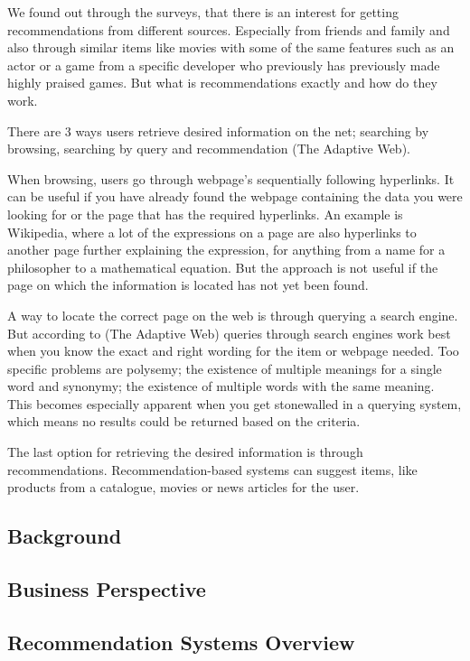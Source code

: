 We found out through the surveys, that there is an interest for getting recommendations from different sources. Especially from friends and family and also through similar items like movies with some of the same features such as an actor or a game from a specific developer who previously has previously made highly praised games. But what is recommendations exactly and how do they work.

There are 3 ways users retrieve desired information on the net; searching by browsing, searching by query and recommendation (The Adaptive Web).

When browsing, users go through webpage's sequentially following hyperlinks. It can be useful if you have already found the webpage containing the data you were looking for or the page that has the required hyperlinks. An example is Wikipedia, where a lot of the expressions on a page are also hyperlinks to another page further explaining the expression, for anything from a name for a philosopher to a mathematical equation. But the approach is not useful if the page on which the information is located has not yet been found.

A way to locate the correct page on the web is through querying a search engine. But according to (The Adaptive Web) queries through search engines work best when you know the exact and right wording for the item or webpage needed. Too specific problems are polysemy; the existence of multiple meanings for a single word and synonymy; the existence of multiple words with the same meaning. This becomes especially apparent when you get stonewalled in a querying system, which means no results could be returned based on the criteria.

The last option for retrieving the desired information is through recommendations. Recommendation-based systems can suggest items, like products from a catalogue, movies or news articles for the user.


\subsection{Background}
\label{Background}

\subsection{Business Perspective}
\label{BusiPers}

\subsection{Recommendation Systems Overview}
\label{Overview}

